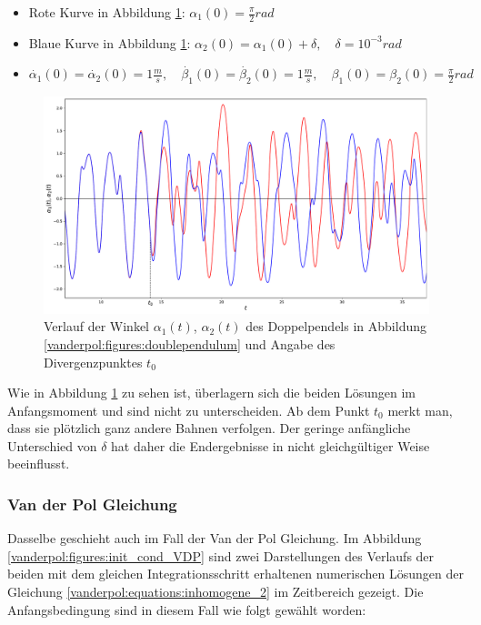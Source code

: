 \begin{itemize}
\item
Rote Kurve in Abbildung \ref{vanderpol:figures:init_cond_dbl_pend}: $\alpha_1(0) = \frac{\pi}{2}rad$
\item
Blaue Kurve in Abbildung \ref{vanderpol:figures:init_cond_dbl_pend}: $\alpha_2(0) = \alpha_1(0) + \delta, \quad \delta = 10^{-3}rad$
\item
$\dot{\alpha_1}(0) = \dot{\alpha_2}(0)= 1 \frac{m}{s}, \quad \dot{\beta_1}(0) = \dot{\beta_2}(0)= 1 \frac{m}{s}, \quad \beta_1(0)=\beta_2(0)=\displaystyle\frac{\pi}{2}rad$
\end{itemize}

\begin{figure}
\includegraphics[width=\textwidth]{papers/vanderpol/figures/initial_cond_DBLPEND.pdf}
\caption{Verlauf der Winkel $\alpha_1(t)$, $\alpha_2(t)$ des Doppelpendels in Abbildung \ref{vanderpol:figures:doublependulum} und Angabe des Divergenzpunktes $t_0$\label{vanderpol:figures:init_cond_dbl_pend}}
\end{figure}
\noindent Wie in Abbildung \ref{vanderpol:figures:init_cond_dbl_pend} zu sehen ist, überlagern sich die beiden Lösungen im Anfangsmoment und sind nicht zu unterscheiden.
Ab dem Punkt $t_0$ merkt man, dass sie plötzlich ganz andere Bahnen verfolgen.
Der geringe anfängliche Unterschied von $\delta$ hat daher die Endergebnisse in nicht gleichgültiger Weise beeinflusst.
\subsubsection{Van der Pol Gleichung}
\label{vanderpol:subsubsection:vdp}
Dasselbe geschieht auch im Fall der Van der Pol Gleichung.
Im  Abbildung \ref{vanderpol:figures:init_cond_VDP} sind zwei Darstellungen des Verlaufs der beiden mit dem gleichen Integrationsschritt erhaltenen numerischen Lösungen der Gleichung \eqref{vanderpol:equations:inhomogene_2} im Zeitbereich gezeigt.
Die Anfangsbedingung sind in diesem Fall wie folgt gewählt worden:

